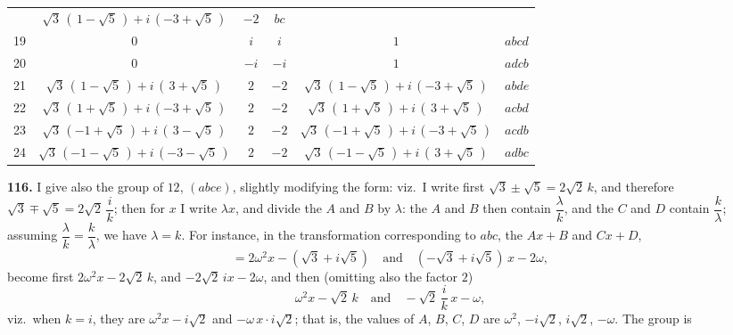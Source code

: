 \documentclass[11pt]{article}
\newcommand{\artno}[1]{\textbf{#1.}\quad}
\begin{document}
\begin{center}
{\begin{tabular}{r|cccc|l}
   & $\sqrt{3}\,(\,1 - \sqrt{5}\,) + i\,(-3 + \sqrt{5}\,)$ & $-2$ & $bc$\\
19 & $0$ & $i$ & $i$ & $1$ & $abcd$\\
20 & $0$ & $-i$ & $-i$ & $1$ & $adcb$\\
21 & $\sqrt{3}\,(\,1 - \sqrt{5}\,) + i\,(\,3 + \sqrt{5}\,)$ & $2$ & $-2$
   & $\sqrt{3}\,(\,1 - \sqrt{5}\,) + i\,(-3 + \sqrt{5}\,)$ & $abde$\\
22 & $\sqrt{3}\,(\,1 + \sqrt{5}\,) + i\,(-3 + \sqrt{5}\,)$ & $2$ & $-2$
   & $\sqrt{3}\,(\,1 + \sqrt{5}\,) + i\,(\,3 + \sqrt{5}\,)$ & $acbd$\\
23 & $\sqrt{3}\,(-1 + \sqrt{5}\,) + i\,(\,3 - \sqrt{5}\,)$ & $2$ & $-2$
   & $\sqrt{3}\,(-1 + \sqrt{5}\,) + i\,(-3 + \sqrt{5}\,)$ & $acdb$\\
24 & $\sqrt{3}\,(-1 - \sqrt{5}\,) + i\,(-3 - \sqrt{5}\,)$ & $2$ & $-2$
   & $\sqrt{3}\,(-1 - \sqrt{5}\,) + i\,(\,3 + \sqrt{5}\,)$ & $adbc$\\
\end{tabular}%
}
\end{center}

\medskip
\noindent
\artno{116} I give also the group of $12$, $(abce)$, slightly modifying the
form: viz.\ I write first $\sqrt{3} \pm \sqrt{5} = 2 \sqrt{2}\,k$, and
therefore $\sqrt{3} \mp \sqrt{5} = 2\sqrt{2}\,\dfrac{i}{k}$; then for $x$ I
write $\lambda x$, and divide the $A$ and $B$ by $\lambda$: the $A$ and $B$
then contain $\dfrac{\lambda}{k}$, and the $C$ and $D$ contain
$\dfrac{k}{\lambda}$; assuming $\dfrac{\lambda}{k} = \dfrac{k}{\lambda}$, we
have $\lambda = k$. For instance, in the transformation corresponding to
$abc$, the $Ax + B$ and $Cx + D$,
\[
  = 2\omega^{2} x - (\sqrt{3} + i\sqrt{5})
  \quad\text{and}\quad
  (-\sqrt{3} + i\sqrt{5})\,x - 2\omega,
\]
become first $2\omega^{2} x - 2\sqrt{2}\,k$, and $-2\sqrt{2}\,i x - 2\omega$,
and then (omitting also the factor $2$)
\[
  \omega^{2} x - \sqrt{2}\,k\quad\text{and}\quad
  -\sqrt{2}\,\frac{i}{k}\,x - \omega,
\]
viz.\ when $k = i$, they are $\omega^{2} x - i\sqrt{2}$ and
$-\omega\,x \cdot i\sqrt{2}$; that is, the values of $A$, $B$, $C$, $D$ are
$\omega^{2}$, $-i\sqrt{2}$, $i\sqrt{2}$, $-\omega$. The group is
\end{document}
